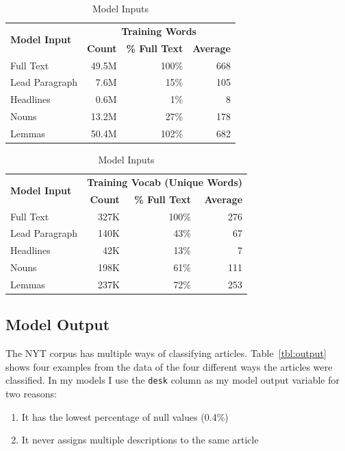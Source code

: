 \documentclass[11pt,a4paper,table]{article}
\begin{document}
\begin{table}
	\centering
	\small
	\begin{tabular}{lrrr}
		\toprule
		\multirow{2}{*}{\textbf{Model Input}} & \multicolumn{3}{c}{\textbf{Training Words}} \\
		\cmidrule{2-4}
		& \textbf{Count} & \textbf{\% Full Text} & \textbf{Average} \\
		\midrule
		Full Text			& 49.5M	& 100\%	& 668 \\
		Lead Paragraph	& 7.6M	& 15\%	& 105 \\
		Headlines			& 0.6M	& 1\%	& 8 \\
		Nouns			& 13.2M	& 27\%	& 178 \\
		Lemmas			& 50.4M	& 102\%	& 682 \\
		\bottomrule
	\end{tabular}
	\begin{tabular}{lrrr}
		\toprule
		\multirow{2}{*}{\textbf{Model Input}} & \multicolumn{3}{c}{\textbf{Training Vocab (Unique Words)}} \\
		\cmidrule{2-4}
		& \textbf{Count} & \textbf{\% Full Text} & \textbf{Average} \\
		\midrule
		Full Text			& 327K	& 100\%	& 276 \\
		Lead Paragraph	& 140K	& 43\%	& 67 \\
		Headlines			& 42K	& 13\%	& 7 \\
		Nouns			& 198K	& 61\%	& 111 \\
		Lemmas			& 237K	& 72\%	& 253 \\
		\bottomrule
	\end{tabular}
	\caption{Model Inputs}
	\label{tbl:inputs}
\end{table}

\subsection{Model Output}
\label{ssec:output}

The NYT corpus has multiple ways of classifying articles. Table~\ref{tbl:output} shows four examples from the data of the four different ways the articles were classified. In my models I use the \texttt{desk} column as my model output variable for two reasons:

\begin{enumerate}
\item It has the lowest percentage of null values (0.4\%)
\item It never assigns multiple descriptions to the same article
\end{enumerate}
\end{document}
